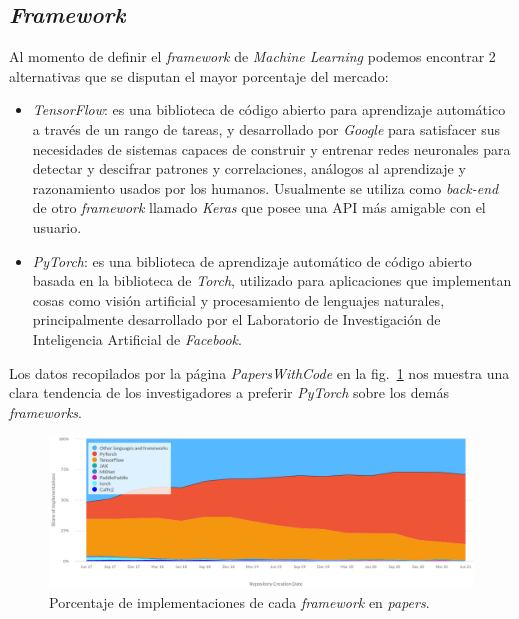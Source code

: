 \documentclass[a4paper,12pt]{article}
\begin{document}
\subsection{\textit{Framework}}

Al momento de definir el \textit{framework} de \textit{Machine Learning} podemos encontrar 2 alternativas que se disputan el mayor porcentaje del mercado:
\begin{itemize}
	\item \textit{TensorFlow}: es una biblioteca de código abierto para aprendizaje automático a través de un rango de tareas, y desarrollado por \textit{Google} para satisfacer sus necesidades de sistemas capaces de construir y entrenar redes neuronales para detectar y descifrar patrones y correlaciones, análogos al aprendizaje y razonamiento usados por los humanos. Usualmente se utiliza como \textit{back-end} de otro \textit{framework} llamado \textit{Keras} que posee una API más amigable con el usuario.
	\item \textit{PyTorch}: es una biblioteca de aprendizaje automático​ de código abierto basada en la biblioteca de \textit{Torch}, utilizado para aplicaciones que implementan cosas como visión artificial y procesamiento de lenguajes naturales, principalmente desarrollado por el Laboratorio de Investigación de Inteligencia Artificial​ de \textit{Facebook}.
\end{itemize}

Los datos recopilados por la página \textit{PapersWithCode} \citep{trendsML} en la fig.~\ref{fig:fw_market} nos muestra una clara tendencia de los investigadores a preferir \textit{PyTorch} sobre los demás \textit{frameworks}.

\begin{figure}[H]
	\begin{center}
	\includegraphics[width=1\textwidth]{fw_market.png}
  	\caption{Porcentaje de implementaciones de cada \textit{framework} en \textit{papers}.}
  	\label{fig:fw_market}
  	\end{center}
\end{figure}
\end{document}
